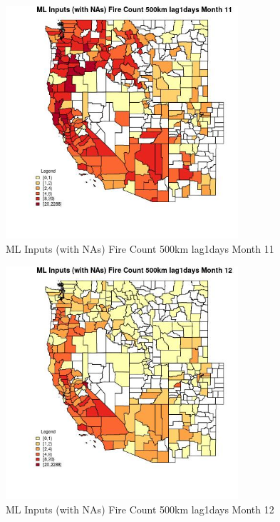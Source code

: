 \begin{figure} 
\centering  
\includegraphics[width=0.77\textwidth]{Code_Outputs/Report_ML_input_PM25_Step4_part_e_de_duplicated_aves_compiled_2019-05-20wNAs_CountyFire_Count_500km_lag1daysmedianMonth11.jpg} 
\caption{\label{fig:Report_ML_input_PM25_Step4_part_e_de_duplicated_aves_compiled_2019-05-20wNAsCountyFire_Count_500km_lag1daysmedianMonth11}ML Inputs (with NAs) Fire Count 500km lag1days Month 11} 
\end{figure} 
 

\begin{figure} 
\centering  
\includegraphics[width=0.77\textwidth]{Code_Outputs/Report_ML_input_PM25_Step4_part_e_de_duplicated_aves_compiled_2019-05-20wNAs_CountyFire_Count_500km_lag1daysmedianMonth12.jpg} 
\caption{\label{fig:Report_ML_input_PM25_Step4_part_e_de_duplicated_aves_compiled_2019-05-20wNAsCountyFire_Count_500km_lag1daysmedianMonth12}ML Inputs (with NAs) Fire Count 500km lag1days Month 12} 
\end{figure} 
 

